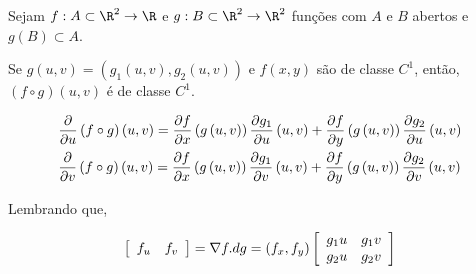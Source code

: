 \documentclass[11pt, oneside, a4paper]{gsm-l}
\begin{document}
\begin{teo}
    Sejam $f:A \subset \R^2 \to \R$ e $g:B \subset \R^2 \to \R^2$ funções com $A$ e $B$ abertos e $g(B) \subset A$.

    Se $g\left( {u,v} \right) = \left( {g_1 \left( {u,v} \right),g_2 \left( {u,v} \right)} \right)$ e $f(x,y)$ são de classe $C^1$, então, $\left( {f \circ g} \right)\left( {u,v} \right)$ é de classe $C^1$.

\[
\begin{gathered}
\frac{\partial }
{{\partial u}}\left( {f \circ g} \right)\left( {u,v} \right) = \frac{{\partial f}}
{{\partial x}}\left( {g\left( {u,v} \right)} \right)\frac{{\partial g_1 }}
{{\partial u}}\left( {u,v} \right) + \frac{{\partial f}}
{{\partial y}}\left( {g\left( {u,v} \right)} \right)\frac{{\partial g_2 }}
{{\partial u}}\left( {u,v} \right) \hfill \\
\frac{\partial }
{{\partial v}}\left( {f \circ g} \right)\left( {u,v} \right) = \frac{{\partial f}}
{{\partial x}}\left( {g\left( {u,v} \right)} \right)\frac{{\partial g_1 }}
{{\partial v}}\left( {u,v} \right) + \frac{{\partial f}}
{{\partial y}}\left( {g\left( {u,v} \right)} \right)\frac{{\partial g_2 }}
{{\partial v}}\left( {u,v} \right) \hfill \\
\end{gathered}
\]

Lembrando que,

\[
\left[ {\begin{array}{*{20}c}
{f_u } & {f_v }  \\

 \end{array} } \right] = \nabla f.dg = \left( {f_x ,f_y } \right)\left[ {\begin{array}{*{20}c}
{g_1 u} & {g_1 v}  \\
{g_2 u} & {g_2 v}  \\

\end{array} } \right]
\]

\end{teo}
\end{document}
